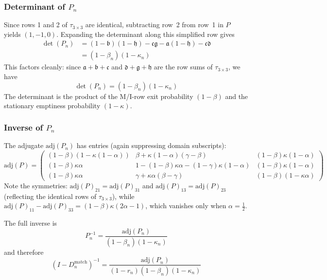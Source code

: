 \documentclass{article}
\newcommand\ext{r}
\newcommand\dom{n}
\newcommand\tkftrans{\tau}
\begin{document}
\subsubsection{\texorpdfstring{Determinant of $P_\dom$}{Determinant of P\_n}}

Since rows 1 and 2 of $\tkftrans_{3\times 3}$ are identical,
subtracting row~2 from row~1 in $P$ yields $(1, -1, 0)$.
Expanding the determinant along this simplified row gives
\begin{align*}
\det(P_\dom) &= (1-\mathfrak{b})(1-\mathfrak{h}) - \mathfrak{c}\mathfrak{g}
   - \mathfrak{a}(1-\mathfrak{h}) - \mathfrak{c}\mathfrak{d} \\
&= (1-\beta_\dom)(1-\kappa_\dom)
\end{align*}
This factors cleanly: since $\mathfrak{a}+\mathfrak{b}+\mathfrak{c}$ and
$\mathfrak{d}+\mathfrak{g}+\mathfrak{h}$ are the row sums of
$\tkftrans_{3\times 3}$, we have
\[
\boxed{\det(P_\dom) = (1-\beta_\dom)(1-\kappa_\dom)}
\]
The determinant is the product of the M/I-row exit probability $(1-\beta)$
and the stationary emptiness probability $(1-\kappa)$.

\subsubsection{\texorpdfstring{Inverse of $P_\dom$}{Inverse of P\_n}}

The adjugate $\text{adj}(P_\dom)$ has entries (again suppressing domain subscripts):
\[
\text{adj}(P) =
\begin{pmatrix}
(1-\beta)(1-\kappa(1-\alpha))
  & \beta + \kappa(1-\alpha)(\gamma-\beta)
  & (1-\beta)\kappa(1-\alpha) \\[4pt]
(1-\beta)\kappa\alpha
  & 1 - (1-\beta)\kappa\alpha - (1-\gamma)\kappa(1-\alpha)
  & (1-\beta)\kappa(1-\alpha) \\[4pt]
(1-\beta)\kappa\alpha
  & \gamma + \kappa\alpha(\beta-\gamma)
  & (1-\beta)(1-\kappa\alpha)
\end{pmatrix}
\]
Note the symmetries: $\text{adj}(P)_{21} = \text{adj}(P)_{31}$
and $\text{adj}(P)_{13} = \text{adj}(P)_{23}$
(reflecting the identical rows of $\tkftrans_{3\times 3}$),
while $\text{adj}(P)_{11} - \text{adj}(P)_{33} = (1-\beta)\kappa(2\alpha-1)$,
which vanishes only when $\alpha = \tfrac{1}{2}$.

The full inverse is
\[
P_\dom^{-1} = \frac{\text{adj}(P_\dom)}{(1-\beta_\dom)(1-\kappa_\dom)}
\]
and therefore
\[
(I - D_\dom^{\text{match}})^{-1} = \frac{\text{adj}(P_\dom)}{(1-\ext_\dom)(1-\beta_\dom)(1-\kappa_\dom)}
\]
\end{document}
